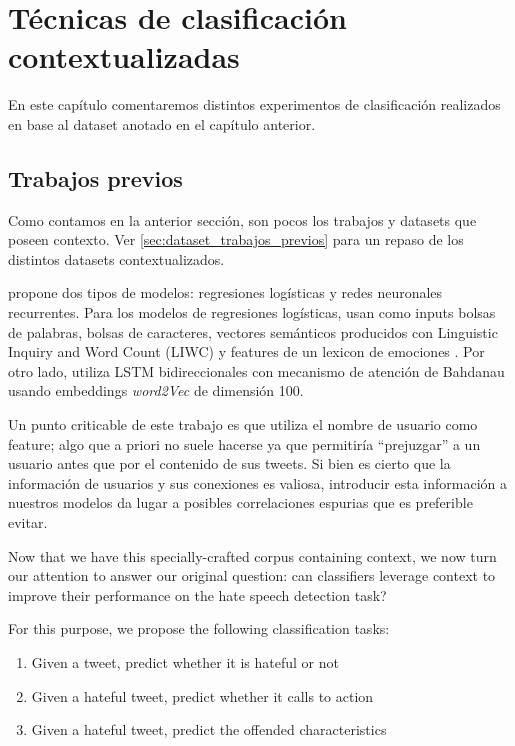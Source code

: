 \section{Técnicas de clasificación contextualizadas}
En este capítulo comentaremos distintos experimentos de clasificación realizados en base al dataset anotado en el capítulo anterior.


\subsection{Trabajos previos}

Como contamos en la anterior sección, son pocos los trabajos y datasets que poseen contexto. Ver \ref{sec:dataset_trabajos_previos} para un repaso de los distintos datasets contextualizados.

\citet{gao2018detecting} propone dos tipos de modelos: regresiones logísticas y redes neuronales recurrentes. Para los modelos de regresiones logísticas, usan como inputs bolsas de palabras, bolsas de caracteres, vectores semánticos producidos con Linguistic Inquiry and Word Count (LIWC) \cite{pennebaker2001linguistic} y features de un lexicon de emociones \cite{mohammad2013nrc}. Por otro lado, utiliza LSTM bidireccionales con mecanismo de atención de Bahdanau \cite{bahdanau2014neural} usando embeddings \emph{word2Vec} de dimensión 100.

Un punto criticable de este trabajo es que utiliza el nombre de usuario como feature; algo que a priori no suele hacerse ya que permitiría ``prejuzgar'' a un usuario antes que por el contenido de sus tweets. Si bien es cierto que la información de usuarios y sus conexiones es valiosa, introducir esta información a nuestros modelos da lugar a posibles correlaciones espurias que es preferible evitar.

Now that we have this specially-crafted corpus containing context, we now turn our attention to answer our original question: can classifiers leverage context to improve their performance on the hate speech detection task?

For this purpose, we propose the following classification tasks:

\begin{enumerate}
    \item Given a tweet, predict whether it is hateful or not
    \item Given a hateful tweet, predict whether it calls to action
    \item Given a hateful tweet, predict the offended characteristics
\end{enumerate}

